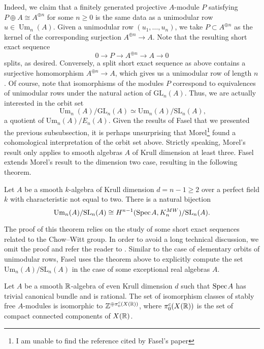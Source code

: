 Indeed, we claim that a finitely generated projective $A$-module $P$ satisfying $P \oplus A \cong A^{\oplus n}$ for some $n \geq 0$ is the same data as a unimodular row $u \in \operatorname{Um}_n(A)$. Given a unimodular row $(u_1,\ldots,u_n)$, we take $P \subset A^{\oplus n}$ as the kernel of the corresponding surjection $A^{\oplus n} \to A$. Note that the resulting short exact sequence \[0 \to P \to A^{\oplus n} \to A \to 0\] splits, as desired. Conversely, a split short exact sequence as above contains a surjective homomorphism $A^{\oplus n} \to A$, which gives us a unimodular row of length $n$. Of course, note that isomorphisms of the modules $P$ correspond to equivalences of unimodular rows under the natural action of $\mathrm{GL}_n(A)$. Thus, we are actually interested in the orbit set \[\operatorname{Um}_n(A)/\mathrm{GL}_n(A) \simeq \mathrm{Um}_n(A)/\mathrm{SL}_n(A),\] a quotient of $\mathrm{Um}_n(A)/E_n(A)$. Given the results of Fasel that we presented the previous subsubsection, it is perhaps unsurprising that Morel\footnote{I am unable to find the reference cited by Fasel's paper} found a cohomological interpretation of the  orbit set above. Strictly speaking, Morel's result only applies to smooth algebras $A$ of Krull dimension at least three. Fasel \cite[Theorem 4.11]{Fasel_2010} extends Morel's result to the dimension two case, resulting in the following theorem.

\begin{theorem}
    Let $A$ be a smooth $k$-algebra of Krull dimension $d = n-1 \geq 2$ over a perfect field $k$ with characteristic not equal to two. There is a natural bijection 
    \[
    \mathrm{Um}_n(A)/\mathrm{SL}_n(A) \cong H^{n-1}(\text{Spec}\hspace{0.1em} A, K^{MW}_n)/\mathrm{SL}_n(A).
    \]
\end{theorem}

The proof of this theorem relies on the study of some short exact sequences related to the Chow--Witt group. In order to avoid a long technical discussion, we omit the proof and refer the reader to \cite[Section 4]{Fasel_2010}. Similar to the case of elementary orbits of unimodular rows, Fasel uses the theorem above to explicitly compute the set $\mathrm{Um}_n(A)/\mathrm{SL}_n(A)$ in the case of some exceptional real algebras $A$.

\begin{theorem}\cite[Theorem 5.9]{Fasel_2010}\label{thm:fasel_stable}
    Let $A$ be a smooth $\mathbb{R}$-algebra of even Krull dimension $d$ such that $\text{Spec}\hspace{0.1em} A$ has trivial canonical bundle and is rational. The set of isomorphism classes of stably free $A$-modules is isomorphic to $\mathbb{Z}^{\oplus \pi_0^c(X(\mathbb{R}))}$, where $\pi_0^c(X(\mathbb{R}))$ is the set of compact connected components of $X(\mathbb{R})$.
\end{theorem}

